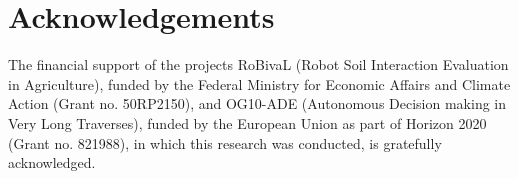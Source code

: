\section*{Acknowledgements}
The financial support of the projects RoBivaL (Robot Soil Interaction Evaluation in Agriculture), funded by the Federal Ministry for Economic Affairs and Climate Action (Grant no. 50RP2150), and OG10-ADE (Autonomous Decision making in Very Long Traverses), funded by the European Union as part of Horizon 2020 (Grant no. 821988), in which this research was conducted, is gratefully acknowledged.
